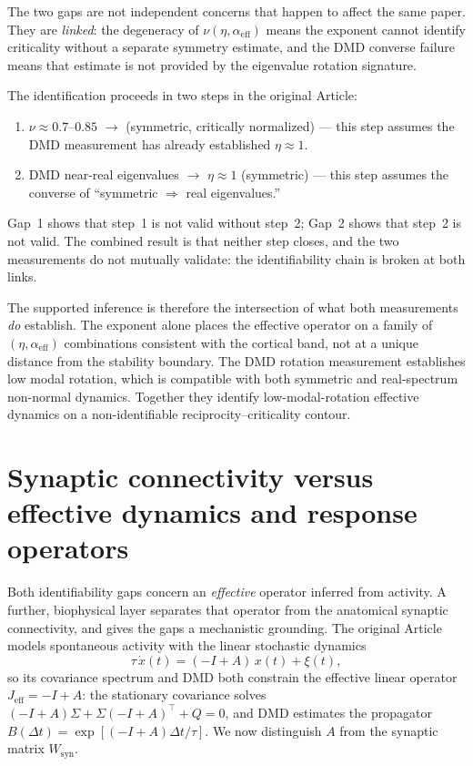 \documentclass[11pt]{article}
\newcommand{\alphaeff}{\alpha_{\mathrm{eff}}}
\begin{document}
The two gaps are not independent concerns that happen to affect the same paper.
They are \emph{linked}: the degeneracy of $\nu(\eta,\alphaeff)$ means the exponent
cannot identify criticality without a separate symmetry estimate, and the DMD
converse failure means that estimate is not provided by the eigenvalue rotation
signature.

The identification proceeds in two steps in the original Article:
\begin{enumerate}
  \item $\nu\approx 0.7$--$0.85$ $\to$ (symmetric, critically normalized)
    --- this step assumes the DMD measurement has already established $\eta\approx 1$.
  \item DMD near-real eigenvalues $\to$ $\eta\approx 1$ (symmetric)
    --- this step assumes the converse of ``symmetric $\Rightarrow$ real eigenvalues.''
\end{enumerate}
Gap~1 shows that step~1 is not valid without step~2; Gap~2 shows that step~2
is not valid. The combined result is that neither step closes, and the two
measurements do not mutually validate: the identifiability chain is broken at
both links.

The supported inference is therefore the intersection of what both measurements
\emph{do} establish. The exponent alone places the effective operator on a
family of $(\eta,\alphaeff)$ combinations consistent with the cortical band,
not at a unique distance from the stability boundary. The DMD rotation
measurement establishes low modal rotation, which is compatible with both
symmetric and real-spectrum non-normal dynamics. Together they identify
low-modal-rotation effective dynamics on a non-identifiable
reciprocity--criticality contour.

\section{Synaptic connectivity versus effective dynamics and response operators}
\label{sec:syn-eff}

Both identifiability gaps concern an \emph{effective} operator inferred from
activity. A further, biophysical layer separates that operator from the
anatomical synaptic connectivity, and gives the gaps a mechanistic grounding.
The original Article\cite{pachitariu2026} models spontaneous activity with the
linear stochastic dynamics
\begin{equation}
\tau\,\dot x(t)=(-I+A)\,x(t)+\xi(t),
\end{equation}
so its covariance spectrum and DMD both constrain the effective linear operator
$J_{\mathrm{eff}}=-I+A$: the stationary covariance solves
$(-I+A)\Sigma+\Sigma(-I+A)^\top+Q=0$, and DMD estimates the propagator
$B(\Delta t)=\exp[(-I+A)\Delta t/\tau]$. We now distinguish $A$ from the
synaptic matrix $W_{\mathrm{syn}}$.
\end{document}
